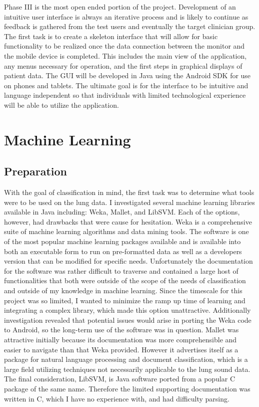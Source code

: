 \documentclass{article}
\begin{document}
Phase III is the most open ended portion of the project. Development of an intuitive user interface is always an iterative process and is likely to continue as feedback is gathered from the test users and eventually the target clinician group. The first task is to create a skeleton interface that will allow for basic functionality to be realized once the data connection between the monitor and the mobile device is completed. This includes the main view of the application, any menus necessary for operation, and the first steps in graphical displays of patient data. The GUI will be developed in Java using the Android SDK for use on phones and tablets. The ultimate goal is for the interface to be intuitive and language independent so that individuals with limited technological experience will be able to utilize the application. \\

\newpage

\section{Machine Learning}

\subsection{Preparation}

With the goal of classification in mind, the first task was to determine what tools were to be used on the lung data. I investigated several machine learning libraries available in Java including: Weka, Mallet, and LibSVM. Each of the options, however, had drawbacks that were cause for hesitation. Weka is a comprehensive suite of machine learning algorithms and data mining tools. The software is one of the most popular machine learning packages available and is available into both an executable form to run on pre-formatted data as well as a developers version that can be modified for specific needs. Unfortunately the documentation for the software was rather difficult to traverse and contained a large host of functionalities that both were outside of the scope of the needs of classification and outside of my knowledge in machine learning. Since the timescale for this project was so limited, I wanted to minimize the ramp up time of learning and integrating a complex library, which made this option unattractive. Additionally investigation revealed that potential issues would arise in porting the Weka code to Android, so the long-term use of the software was in question. Mallet was attractive initially because its documentation was more comprehensible and easier to navigate than that Weka provided. However it advertises itself as a package for natural language processing and document classification, which is a large field utilizing techniques not necessarily applicable to the lung sound data. The final consideration, LibSVM, is Java software ported from a popular C package of the same name. Therefore the limited supporting documentation was written in C, which I have no experience with, and had difficulty parsing.\\
\end{document}
